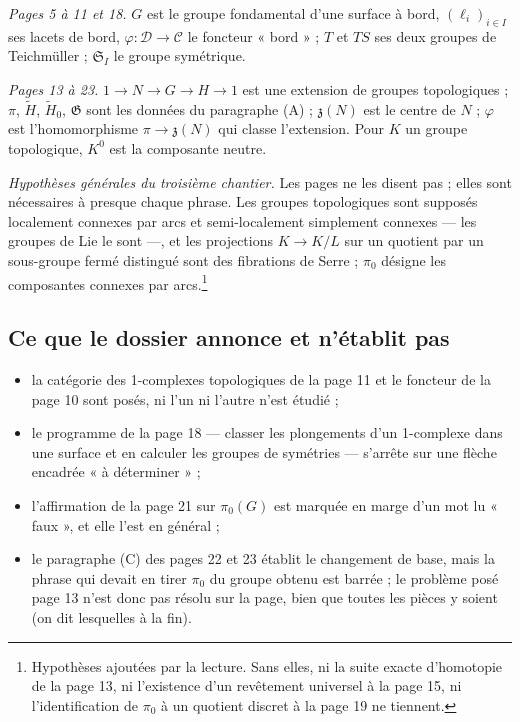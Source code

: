 \documentclass[11pt,a4paper]{article}
\begin{document}
\emph{Pages 5 à 11 et 18.} $G$ est le groupe fondamental d'une surface à
bord, $(\ell_i)_{i \in I}$ ses lacets de bord, $\varphi : \mathcal{D} \to
\mathcal{C}$ le foncteur « bord » ; $T$ et $TS$ ses deux groupes de
Teichmüller ; $\mathfrak{S}_I$ le groupe symétrique.

\emph{Pages 13 à 23.} $1 \to N \to G \to H \to 1$ est une extension de
groupes topologiques ; $\pi$, $\widetilde{H}$, $\widetilde{H}_0$,
$\mathfrak{G}$ sont les données du paragraphe (A) ; $\mathfrak{z}(N)$ est le
centre de $N$ ; $\varphi$ est l'homomorphisme $\pi \to \mathfrak{z}(N)$ qui
classe l'extension. Pour $K$ un groupe topologique, $K^0$ est la composante
neutre.

\emph{Hypothèses générales du troisième chantier.} Les pages ne les disent
pas ; elles sont nécessaires à presque chaque phrase. Les groupes
topologiques sont supposés localement connexes par arcs et semi-localement
simplement connexes — les groupes de Lie le sont —, et les projections
$K \to K/L$ sur un quotient par un sous-groupe fermé distingué sont des
fibrations de Serre ; $\pi_0$ désigne les composantes connexes par
arcs.\footnote{Hypothèses ajoutées par la lecture. Sans elles, ni la suite
exacte d'homotopie de la page 13, ni l'existence d'un revêtement universel à
la page 15, ni l'identification de $\pi_0$ à un quotient discret à la page 19
ne tiennent.}

\subsection*{Ce que le dossier annonce et n'établit pas}

\begin{itemize}
\item la catégorie des 1-complexes topologiques de la page 11 et le foncteur
de la page 10 sont posés, ni l'un ni l'autre n'est étudié ;
\item le programme de la page 18 — classer les plongements d'un 1-complexe
dans une surface et en calculer les groupes de symétries — s'arrête sur une
flèche encadrée « à déterminer » ;
\item l'affirmation de la page 21 sur $\pi_0(G)$ est marquée en marge d'un mot
lu « faux », et elle l'est en général ;
\item le paragraphe (C) des pages 22 et 23 établit le changement de base,
mais la phrase qui devait en tirer $\pi_0$ du groupe obtenu est barrée ; le
problème posé page 13 n'est donc pas résolu sur la page, bien que toutes les
pièces y soient (on dit lesquelles à la fin).
\end{itemize}
\end{document}
